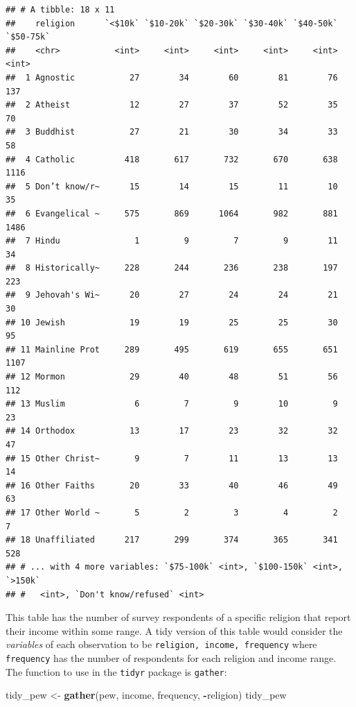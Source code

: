 \documentclass[12pt,]{book}
\newenvironment{Shaded}{\begin{snugshade}}{\end{snugshade}}
\newcommand{\KeywordTok}[1]{\textcolor[rgb]{0.13,0.29,0.53}{\textbf{#1}}}
\newcommand{\StringTok}[1]{\textcolor[rgb]{0.31,0.60,0.02}{#1}}
\newcommand{\OperatorTok}[1]{\textcolor[rgb]{0.81,0.36,0.00}{\textbf{#1}}}
\newcommand{\NormalTok}[1]{#1}
\theoremstyle{definition}
\theoremstyle{definition}
\theoremstyle{definition}
\theoremstyle{remark}
\begin{document}
\begin{verbatim}
## # A tibble: 18 x 11
##    religion      `<$10k` `$10-20k` `$20-30k` `$30-40k` `$40-50k` `$50-75k`
##    <chr>           <int>     <int>     <int>     <int>     <int>     <int>
##  1 Agnostic           27        34        60        81        76       137
##  2 Atheist            12        27        37        52        35        70
##  3 Buddhist           27        21        30        34        33        58
##  4 Catholic          418       617       732       670       638      1116
##  5 Don’t know/r~      15        14        15        11        10        35
##  6 Evangelical ~     575       869      1064       982       881      1486
##  7 Hindu               1         9         7         9        11        34
##  8 Historically~     228       244       236       238       197       223
##  9 Jehovah's Wi~      20        27        24        24        21        30
## 10 Jewish             19        19        25        25        30        95
## 11 Mainline Prot     289       495       619       655       651      1107
## 12 Mormon             29        40        48        51        56       112
## 13 Muslim              6         7         9        10         9        23
## 14 Orthodox           13        17        23        32        32        47
## 15 Other Christ~       9         7        11        13        13        14
## 16 Other Faiths       20        33        40        46        49        63
## 17 Other World ~       5         2         3         4         2         7
## 18 Unaffiliated      217       299       374       365       341       528
## # ... with 4 more variables: `$75-100k` <int>, `$100-150k` <int>, `>150k`
## #   <int>, `Don't know/refused` <int>
\end{verbatim}

This table has the number of survey respondents of a specific religion
that report their income within some range. A tidy version of this table
would consider the \emph{variables} of each observation to be
\texttt{religion,\ income,\ frequency} where \texttt{frequency} has the
number of respondents for each religion and income range. The function
to use in the \texttt{tidyr} package is \texttt{gather}:

\begin{Shaded}
\begin{Highlighting}[]
\NormalTok{tidy_pew <-}\StringTok{ }\KeywordTok{gather}\NormalTok{(pew, income, frequency, }\OperatorTok{-}\NormalTok{religion)}
\NormalTok{tidy_pew}
\end{Highlighting}
\end{Shaded}
\end{document}
